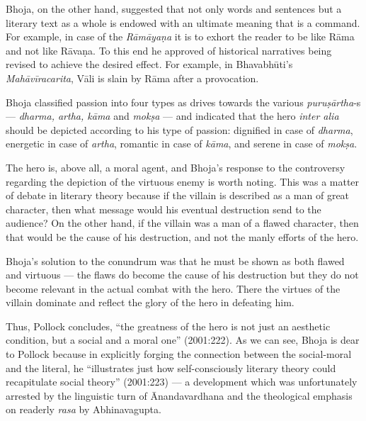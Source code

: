 Bhoja, on the other hand, suggested that not only words and sentences but a literary text as a whole is endowed with an ultimate meaning that is a command. For example, in case of the \textsl{Rāmāyaṇa} it is to exhort the reader to be like Rāma and not like Rāvaṇa. To this end he approved of historical narratives being revised to achieve the desired effect. For example, in Bhavabhūti's \textsl{Mahāvīracarita}, Vāli is slain by Rāma after a provocation. 

Bhoja classified passion into four types as drives towards the various \textsl{puruṣārtha}-s --- \textsl{dharma, artha, kāma} and \textsl{mokṣa} --- and indicated that the hero \textsl{inter alia} should be depicted according to his type of passion: dignified in case of \textsl{dharma}, energetic in case of \textsl{artha}, romantic in case of \textsl{kāma}, and serene in case of \textsl{mokṣa}. 

The hero is, above all, a moral agent, and Bhoja's response to the controversy regarding the depiction of the virtuous enemy is worth noting. This was a matter of debate in literary theory because if the villain is described as a man of great character, then what message would his eventual destruction send to the audience? On the other hand, if the villain was a man of a flawed character, then that would be the cause of his destruction, and not the manly efforts of the hero.

Bhoja's solution to the conundrum was that he must be shown as both flawed and virtuous --- the flaws do become the cause of his destruction but they do not become relevant in the actual combat with the hero. There the virtues of the villain dominate and reflect the glory of the hero in defeating him. 
 
Thus, Pollock concludes, ``the greatness of the hero is not just an aesthetic condition, but a social and a moral one'' (2001:222). As we can see, Bhoja is dear to Pollock because in explicitly forging the connection between the social-moral and the literal, he ``illustrates just how self-consciously literary theory could recapitulate social theory'' (2001:223) --- a development which was unfortunately arrested by the linguistic turn of Ānandavardhana and the theological emphasis on readerly \textsl{rasa} by Abhinavagupta.

